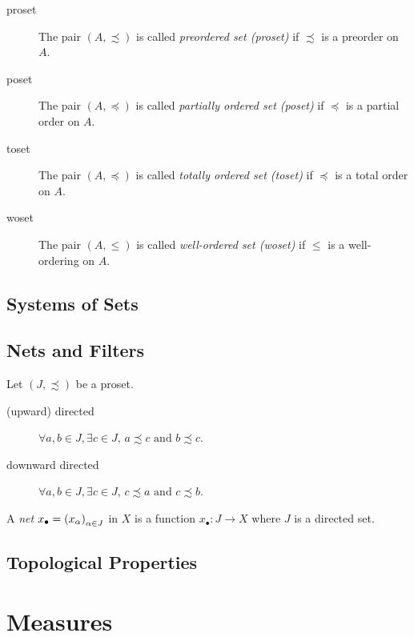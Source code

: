 \begin{description}
    \item[proset] The pair \((A,\precsim) \) is called \emph{preordered set (proset)} if \(\precsim \) is a preorder on \(A\).
    \item[poset] The pair \((A,\preccurlyeq)\) is called \emph{partially ordered set (poset)} if \(\preceq\) is a partial order on \(A\).
    \item[toset] The pair \((A,\preceq)\) is called \emph{totally ordered set (toset)} if \(\preceq\) is a total order on \(A\).
    \item[woset] The pair \((A,\le)\) is called \emph{well-ordered set (woset)} if \(\le\) is a well-ordering on \(A\).
\end{description}

\section{Systems of Sets}

\cite{MR2977961}

\section{Nets and Filters}

\begin{definition} Let \((J, \precsim)\) be a proset.
    \begin{description}
        \item[(upward) directed] \(\forall a,b \in J,\exists c \in J,\, a\precsim c \mbox{ and } b \precsim c \).
        \item[downward directed] \(\forall a,b \in J,\exists c \in J,\, c \precsim a \mbox{ and } c \precsim b\).
    \end{description}
\end{definition}

\begin{definition}
    A \emph{net} \(x_\bullet = \Net \) in \(X\) is a function \(x_\bullet: J \to X\) where \(J\) is a directed set. 
\end{definition}


\section{Topological Properties}

\chapter{Measures}

